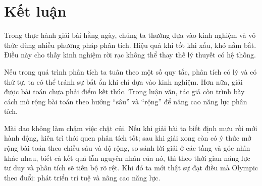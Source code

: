 \documentclass[11pt]{article}
\begin{document}
\section{Kết luận}

Trong thực hành giải bài hằng ngày, chúng ta thường dựa vào kinh nghiệm và
vô thức dùng nhiều phương pháp phân tích. Hiệu quả khi tốt khi xấu, khó nắm
bắt. Điều này cho thấy kinh nghiệm rời rạc không thể thay thế lý thuyết có
hệ thống.

Nếu trong quá trình phân tích ta tuân theo một số quy tắc, phân tích có lý và
có thứ tự, ta có thể tránh sự bất ổn khi chỉ dựa vào kinh nghiệm. Hơn nữa,
giải được bài toán chưa phải điểm kết thúc. Trong luận văn, tác giả còn trình
bày cách mở rộng bài toán theo hướng ``sâu'' và ``rộng'' để nâng cao năng lực
phân tích.

Mài dao không làm chậm việc chặt củi. Nếu khi giải bài ta biết định mưu rồi
mới hành động, kiên trì thói quen phân tích tốt; sau khi giải xong còn có ý
thức mở rộng bài toán theo chiều sâu và độ rộng, so sánh lời giải ở các tầng
và góc nhìn khác nhau, biết cả kết quả lẫn nguyên nhân của nó, thì theo thời
gian năng lực tư duy và phân tích sẽ tiến bộ rõ rệt. Khi đó ta mới thật sự
đạt điều mà Olympic theo đuổi: phát triển trí tuệ và nâng cao năng lực.
\end{document}
